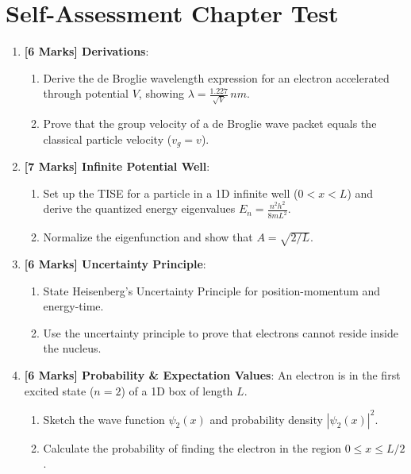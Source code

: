 \section{Self-Assessment Chapter Test}

\begin{chaptertest}
\begin{enumerate}
    \item \textbf{[6 Marks] Derivations}:
    \begin{enumerate}
        \item Derive the de Broglie wavelength expression for an electron accelerated through potential $V$, showing $\lambda = \frac{1.227}{\sqrt{V}}\,\si{nm}$.
        \item Prove that the group velocity of a de Broglie wave packet equals the classical particle velocity ($v_g = v$).
    \end{enumerate}
    
    \item \textbf{[7 Marks] Infinite Potential Well}:
    \begin{enumerate}
        \item Set up the TISE for a particle in a 1D infinite well ($0 < x < L$) and derive the quantized energy eigenvalues $E_n = \frac{n^2 h^2}{8mL^2}$.
        \item Normalize the eigenfunction and show that $A = \sqrt{2/L}$.
    \end{enumerate}
    
    \item \textbf{[6 Marks] Uncertainty Principle}:
    \begin{enumerate}
        \item State Heisenberg's Uncertainty Principle for position-momentum and energy-time.
        \item Use the uncertainty principle to prove that electrons cannot reside inside the nucleus.
    \end{enumerate}
    
    \item \textbf{[6 Marks] Probability \& Expectation Values}:
    An electron is in the first excited state ($n=2$) of a 1D box of length $L$.
    \begin{enumerate}
        \item Sketch the wave function $\psi_2(x)$ and probability density $|\psi_2(x)|^2$.
        \item Calculate the probability of finding the electron in the region $0 \le x \le L/2$.
    \end{enumerate}
\end{enumerate}
\end{chaptertest}

